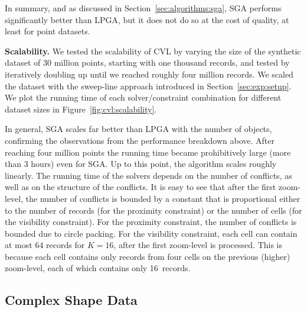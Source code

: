 \documentclass[11pt, oneside]{report}
\newcommand{\minisec}[1]{\noindent\textbf{#1.}}
\begin{document}
In summary, and as discussed in Section~\ref{sec:algorithms:sga}, SGA performs significantly better than LPGA, but it does not do so at the cost of quality, at least for point datasets.


\minisec{Scalability}
We tested the scalability of CVL by varying the size of the synthetic dataset of 30 million points, starting with one thousand records, and tested by iteratively doubling up until we reached roughly four million records. We scaled the dataset with the sweep-line approach introduced in Section~\ref{sec:exp:setup}. We plot the running time of each solver/constraint combination for different dataset sizes in Figure~\ref{fig:cvl:scalability}.

In general, SGA scales far better than LPGA with the number of objects, confirming the observations from the performance breakdown above. After reaching four million points the running time became prohibitively large (more than 3 hours) even for SGA. Up to this point, the algorithm scales roughly linearly. The running time of the solvers depends on the number of conflicts, as well as on the structure of the conflicts. It is easy to see that after the first zoom-level, the number of conflicts is bounded by a constant that is proportional either to the number of records (for the proximity constraint) or the number of cells (for the visibility constraint). For the proximity constraint, the number of conflicts is bounded due to circle packing. For the visibility constraint, each cell can contain at most $64$ records for $K=16$, after the first zoom-level is processed. This is because each cell contains only records from four cells on the previous (higher) zoom-level, each of which contains only 16~records.



\subsection{Complex Shape Data}
\label{sec:exp:complex:shapes}
\end{document}

